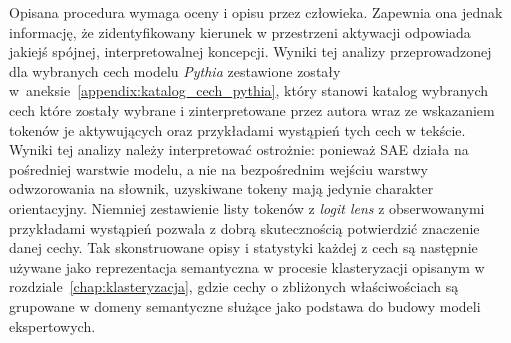 Opisana procedura wymaga oceny i opisu przez człowieka. Zapewnia ona jednak informację, że zidentyfikowany kierunek w przestrzeni aktywacji odpowiada jakiejś spójnej, interpretowalnej koncepcji. Wyniki tej analizy przeprowadzonej dla wybranych cech modelu \textit{Pythia} zestawione zostały w~aneksie~\ref{appendix:katalog_cech_pythia}, który stanowi katalog wybranych cech które zostały wybrane i zinterpretowane przez autora wraz ze wskazaniem tokenów je aktywujących oraz przykładami wystąpień tych cech w tekście. \newline
Wyniki tej analizy należy interpretować ostrożnie: ponieważ SAE działa na pośredniej warstwie modelu, a nie na bezpośrednim wejściu warstwy odwzorowania na słownik, uzyskiwane tokeny mają jedynie charakter orientacyjny. Niemniej zestawienie listy tokenów z \textit{logit lens} z obserwowanymi przykładami wystąpień pozwala z dobrą skutecznością potwierdzić znaczenie danej cechy. \newline
Tak skonstruowane opisy i statystyki każdej z cech są następnie używane jako reprezentacja semantyczna w procesie klasteryzacji opisanym w rozdziale~\ref{chap:klasteryzacja}, gdzie cechy o zbliżonych właściwościach są grupowane w domeny semantyczne służące jako podstawa do budowy modeli ekspertowych.